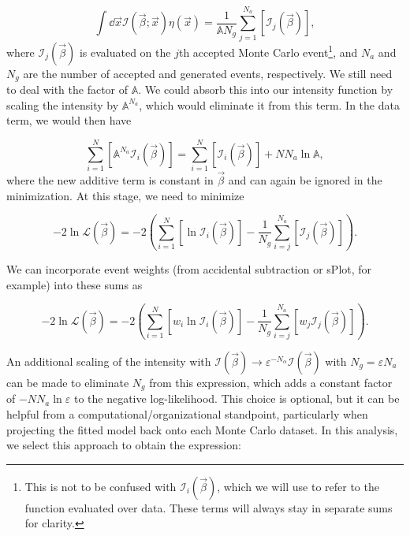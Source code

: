 \begin{equation}
  \int \dd{\vec{x}} \mathcal{I}(\vec{\beta}; \vec{x})\eta(\vec{x}) = \frac{1}{\mathbb{A} N_g} \sum_{j=1}^{N_a} \left[\mathcal{I}_j(\vec{\beta})\right],
\end{equation}
where $\mathcal{I}_j(\vec{\beta})$ is evaluated on the $j$th accepted Monte Carlo event\footnote{This is not to be confused with $\mathcal{I}_i(\vec{\beta})$, which we will use to refer to the function evaluated over data. These terms will always stay in separate sums for clarity.}, and $N_a$ and $N_g$ are the number of accepted and generated events, respectively. We still need to deal with the factor of $\mathbb{A}$. We could absorb this into our intensity function by scaling the intensity by $\mathbb{A}^{N_a}$, which would eliminate it from this term. In the data term, we would then have

\begin{equation}
  \sum_{i=1}^N \left[\mathbb{A}^{N_a}\mathcal{I}_i(\vec{\beta})\right] = \sum_{i=1}^N \left[\mathcal{I}_i(\vec{\beta})\right] + NN_a\ln\mathbb{A},
\end{equation}
where the new additive term is constant in $\vec{\beta}$ and can again be ignored in the minimization. At this stage, we need to minimize

\begin{equation}
  -2\ln\mathcal{L}(\vec{\beta}) = -2\left(\sum_{i=1}^N\left[\ln\mathcal{I}_i(\vec{\beta})\right] - \frac{1}{N_g} \sum_{i=j}^{N_a}\left[\mathcal{I}_j(\vec{\beta})\right]\right).
\end{equation}

We can incorporate event weights (from accidental subtraction or sPlot, for example) into these sums as

\begin{equation}
  -2\ln\mathcal{L}(\vec{\beta}) = -2\left(\sum_{i=1}^N\left[w_i\ln\mathcal{I}_i(\vec{\beta})\right] - \frac{1}{N_g} \sum_{i=j}^{N_a}\left[w_j\mathcal{I}_j(\vec{\beta})\right]\right).
\end{equation}

An additional scaling of the intensity with $\mathcal{I}(\vec{\beta}) \to \varepsilon^{-N_{\alpha}}\mathcal{I}(\vec{\beta})$ with $N_g = \varepsilon N_a$ can be made to eliminate $N_g$ from this expression, which adds a constant factor of $-NN_a\ln\varepsilon$ to the negative log-likelihood. This choice is optional, but it can be helpful from a computational/organizational standpoint, particularly when projecting the fitted model back onto each Monte Carlo dataset. In this analysis, we select this approach to obtain the expression:

